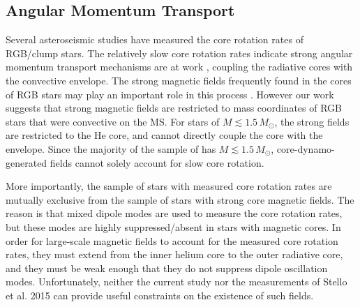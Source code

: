 \subsection{Angular Momentum Transport}

Several asteroseismic studies \citep{Beck_2012,Mosser_2012,Deheuvels_2014,Deheuvels_2015} have measured the core rotation rates of RGB/clump stars. The relatively slow core rotation rates indicate strong angular momentum transport mechanisms are at work \citep{Cantiello_2014}, coupling the radiative cores with the convective envelope. The strong magnetic fields frequently found in the cores of RGB stars \citep{Stello_2016} may play an important role in this process \citep{Kissin_2015}. However our work suggests that strong magnetic fields are restricted to mass coordinates of RGB stars that were convective on the MS. For stars of $M \lesssim 1.5 \, M_\odot$, the strong fields are restricted to the He core, and cannot directly couple the core with the envelope. Since the majority of the sample of \cite{Mosser_2012} has $M \lesssim 1.5 \, M_\odot$, core-dynamo-generated fields cannot solely account for slow core rotation.

More importantly, the sample of stars with measured core rotation rates are mutually exclusive from the sample of stars with strong core magnetic fields. The reason is that mixed dipole modes are used to measure the core rotation rates, but these modes are highly suppressed/absent in stars with magnetic cores. In order for large-scale magnetic fields to account for the measured core rotation rates, they must extend from the inner helium core to the outer radiative core, and they must be weak enough that they do not suppress dipole oscillation modes. Unfortunately, neither the current study nor the measurements of Stello et al. 2015 can provide useful constraints on the existence of such fields. 
